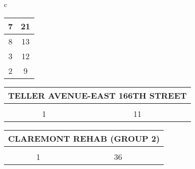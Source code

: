 \begin{table}[H]
\begin{tabular}{c}
\begin{tabular}{cc}
\multicolumn{1}{|c|}{7}                                                        & \multicolumn{1}{c|}{21}                                                             \\ \hline
\multicolumn{1}{|c|}{8}                                                        & \multicolumn{1}{c|}{13}                                                             \\ \hline
\multicolumn{1}{|c|}{3}                                                        & \multicolumn{1}{c|}{12}                                                             \\ \hline
\multicolumn{1}{|c|}{2}                                                        & \multicolumn{1}{c|}{9}                                                             \\ \hline
\end{tabular}
                        \begin{tabular}{cc}
                        \multicolumn{2}{l}{TELLER AVENUE-EAST 166TH STREET}                                                                                                                                   \\ \hline
                        \rowcolor{\ccorange} 
                        \multicolumn{1}{|c|}{\cellcolor{\ccorange}{\color[HTML]{FFFFFF} Building}} & \multicolumn{1}{c|}{\cellcolor{\ccorange}{\color[HTML]{FFFFFF} Total Repairs}} \\ \hline
                        \multicolumn{1}{|c|}{1}                                                        & \multicolumn{1}{c|}{11}                                                             \\ \hline
\end{tabular}
                        \begin{tabular}{cc}
                        \multicolumn{2}{l}{CLAREMONT REHAB (GROUP 2)}                                                                                                                                   \\ \hline
                        \rowcolor{\ccorange} 
                        \multicolumn{1}{|c|}{\cellcolor{\ccorange}{\color[HTML]{FFFFFF} Building}} & \multicolumn{1}{c|}{\cellcolor{\ccorange}{\color[HTML]{FFFFFF} Total Repairs}} \\ \hline
                        \multicolumn{1}{|c|}{1}                                                        & \multicolumn{1}{c|}{36}                                                             \\ \hline

\end{tabular}
\end{tabular}
\end{table}
